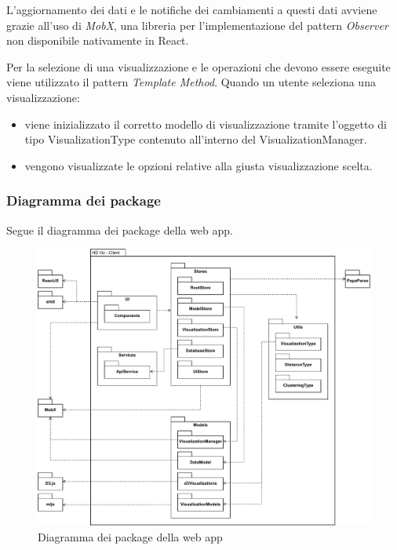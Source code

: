     L'aggiornamento dei dati e le notifiche dei cambiamenti a questi dati avviene grazie all'uso di \emph{MobX}, una libreria per l'implementazione del pattern \emph{Observer} non disponibile nativamente in React\glo .
    
    Per la selezione di una visualizzazione e le operazioni che devono essere eseguite viene utilizzato il pattern \emph{Template Method}.
    Quando un utente seleziona una visualizzazione:
    \begin{itemize}
        \item viene inizializzato il corretto modello di visualizzazione tramite l'oggetto di tipo VisualizationType contenuto all'interno del VisualizationManager.
        \item vengono visualizzate le opzioni relative alla giusta visualizzazione scelta.
    \end{itemize}
    
    \pagebreak
    
    \subsubsection{Diagramma dei package}
    Segue il diagramma dei package della web app.
    
    \begin{figure}[htbp]
        \centering
        \includegraphics[width=1\textwidth]{source/img/package.pdf}
        \caption{Diagramma dei package della web app}
    \end{figure}
    
